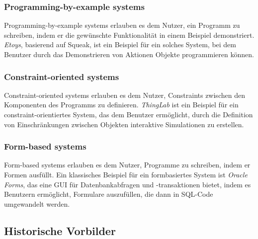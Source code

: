 \documentclass[ngerman]{article}
\begin{document}
\subsubsection{Programming-by-example systems}
Programming-by-example systems erlauben es dem Nutzer, ein Programm zu schreiben, indem er die gewünschte Funktionalität in einem Beispiel demonstriert. \textit{Etoys}, basierend auf Squeak, ist ein Beispiel für ein solches System, bei dem Benutzer durch das Demonstrieren von Aktionen Objekte programmieren können.

\subsubsection{Constraint-oriented systems}
Constraint-oriented systems erlauben es dem Nutzer, Constraints zwischen den Komponenten des Programms zu definieren. \textit{ThingLab} ist ein Beispiel für ein constraint-orientiertes System, das dem Benutzer ermöglicht, durch die Definition von Einschränkungen zwischen Objekten interaktive Simulationen zu erstellen.

\subsubsection{Form-based systems}
Form-based systems erlauben es dem Nutzer, Programme zu schreiben, indem er Formen ausfüllt. Ein klassisches Beispiel für ein formbasiertes System ist \textit{Oracle Forms}, das eine GUI für Datenbankabfragen und -transaktionen bietet, indem es Benutzern ermöglicht, Formulare auszufüllen, die dann in SQL-Code umgewandelt werden.

\subsection{Historische Vorbilder}
\end{document}
